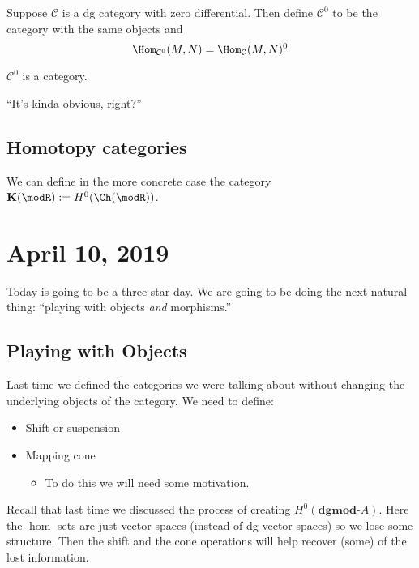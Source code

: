 \documentclass[12pt]{article}
\newcommand*{\dgmodA}{\mathbf{dgmod}\text{-}A}
\begin{document}
\begin{defn}
	Suppose $\mathcal C$ is a dg category with zero differential. Then define
	$\mathcal C^0$ to be the category with the same objects and 
	\[\Hom_{\mathcal C^0}(M,N)=\Hom_{\mathcal C}(M,N)^0\]
\end{defn}
\begin{lem}
	$\mathcal C^0$ is a category.
\end{lem}
\begin{prf}
	``It's kinda obvious, right?''
\end{prf}

\subsection{Homotopy categories}
We can define in the more concrete case the category $\mathbf{K}(\modR):=H^0(\Ch(\modR))$.

\section{April 10, 2019}
Today is going to be a three-star day. We are going to be doing the next natural thing: ``playing with objects \textit{and} morphisms.''

\subsection{Playing with Objects}
Last time we defined the categories we were talking about without changing the underlying objects of the category.
We need to define:
\begin{itemize}
	\item Shift or suspension
	\item Mapping cone
	\begin{itemize}
		\item To do this we will need some motivation.
	\end{itemize}
\end{itemize}
Recall that last time we discussed the process of creating $H^0(\dgmodA)$. Here the $\hom$ sets 
are just vector spaces (instead of dg vector spaces) so we lose some structure. Then the shift and the
cone operations will help recover (some) of the lost information.
\end{document}
